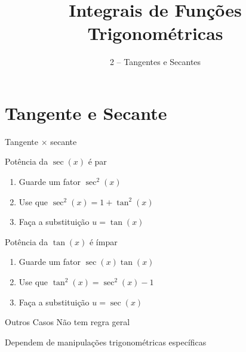 
\usepackage{integracao_e_series}

\title{Integrais de Funções Trigonométricas}
\subtitle{2 -- Tangentes e Secantes}



\addtitle

\section{Tangente e Secante}

\begin{frame}{Tangente $\times$ secante}
\end{frame}

\begin{frame}{Potência da $\sec(x)$ é par}
  \begin{enumerate}[<+->]
    \setlength\itemsep{1em}
    \item Guarde um fator $\sec^2(x)$
    \item Use que $\sec^2(x) = 1 + \tan^2(x)$
    \item Faça a substituição $u = \tan(x)$
  \end{enumerate}
\end{frame}

\begin{frame}{Potência da $\tan(x)$ é ímpar}
  \begin{enumerate}[<+->]
    \setlength\itemsep{1em}
    \item Guarde um fator $\sec(x)\tan(x)$
    \item Use que $\tan^2(x)=\sec^2(x)-1$
    \item Faça a substituição $u=\sec(x)$
  \end{enumerate}
\end{frame}

\begin{frame}{Outros Casos}
  Não tem regra geral

  Dependem de manipulações trigonométricas específicas
\end{frame}

